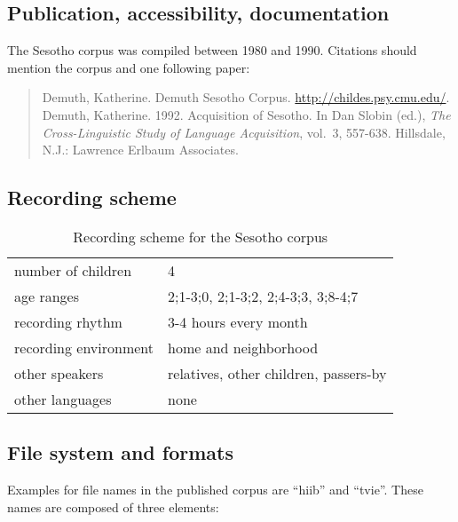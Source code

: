 \documentclass[a4paper, 11pt]{book}
\begin{document}
\subsection{Publication, accessibility, documentation}

The Sesotho corpus \citep{Demuth1992b, Demuth2015a} was compiled between 1980 and 1990. Citations should mention the corpus and one following paper: 

\begin{quote}
	Demuth, Katherine. Demuth Sesotho Corpus. \href{http://childes.talkbank.org/access/Other/Sesotho/Demuth.html}{http://childes.psy.cmu.edu/}. \\
	Demuth, Katherine. 1992. Acquisition of Sesotho. In Dan Slobin (ed.), \emph{The Cross-Linguistic Study of Language Acquisition}, vol.\ 3, 557-638. Hillsdale, N.J.: Lawrence Erlbaum Associates.
\end{quote}

\subsection{Recording scheme}

\begin{table}[ht]
	\centering
	\begin{tabular}{ll}
		\toprule
		number of children 	& 4 \\
		age ranges 			& 2;1-3;0, 2;1-3;2, 2;4-3;3, 3;8-4;7 \\
		recording rhythm 	& 3-4 hours every month \\
		recording environment & home and neighborhood \\
		other speakers 		& relatives, other children, passers-by \\
		other languages		& none \\
		\bottomrule
	\end{tabular}
	\caption{Recording scheme for the Sesotho corpus}
	\label{tab:Sesotho recording scheme}
\end{table}

\subsection{File system and formats}

Examples for file names in the published corpus are “hiib” and “tvie”. These names are composed of three elements: 
\end{document}
